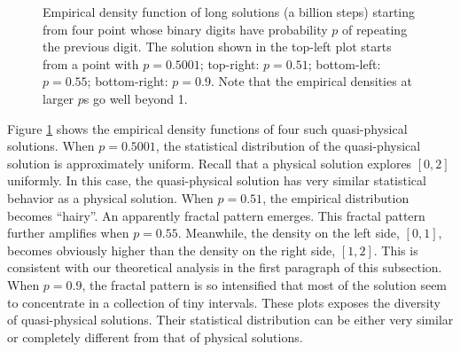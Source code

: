\begin{figure}[H]
\caption{Empirical density function of long solutions (a billion steps)
starting from four point whose binary digits have probability $p$ of
repeating the previous digit.
The solution shown in the top-left plot starts from a point with $p=0.5001$;
top-right: $p=0.51$; bottom-left: $p=0.55$; bottom-right: $p=0.9$.
Note that the empirical densities at larger $p$s go well beyond 1.}
\label{fig:tent_quasiphysical}
\end{figure}

Figure \ref{fig:tent_quasiphysical} shows the empirical density functions of
four such quasi-physical solutions.  When $p=0.5001$,
the statistical distribution of the quasi-physical solution
is approximately uniform.  Recall that a physical solution explores $[0,2]$
uniformly.  In this case, the quasi-physical solution has very similar
statistical behavior as a physical solution.  When $p=0.51$, the empirical
distribution becomes ``hairy''.  An apparently fractal pattern emerges.
This fractal pattern further amplifies when $p=0.55$.  Meanwhile,
the density on the left side, $[0,1]$, becomes obviously higher than
the density on the right side, $[1,2]$.  This is consistent with our
theoretical analysis in the first paragraph of this subsection.
When $p=0.9$, the fractal pattern is so intensified that most
of the solution seem to concentrate in a collection of tiny intervals.
These plots exposes the diversity of quasi-physical solutions.
Their statistical distribution can be either
very similar or completely different from that of physical solutions.

